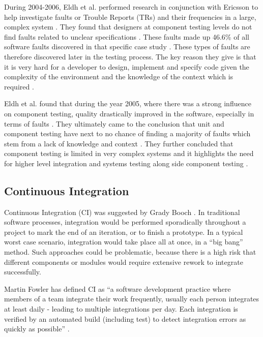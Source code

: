 \documentclass[fina_report_innit.tex]{subfiles}
\begin{document}
During 2004-2006, Eldh et al. performed research in conjunction with Ericsson to help investigate faults or Trouble Reports (TRs) and their frequencies in a large, complex system \cite{eldh2007component}. They found that designers at component testing levels do not find faults related to unclear specifications \cite{eldh2007component}. These faults made up 46.6\% of all software faults discovered in that specific case study \cite{eldh2007component}. These types of faults are therefore discovered later in the testing process. The key reason they give is that it is very hard for a developer to design, implement and specify code given the complexity of the environment and the knowledge of the context which is required \cite{eldh2007component}. 

Eldh et al. found that during the year 2005, where there was a strong influence on component testing, quality drastically improved in the software, especially in terms of faults \cite{eldh2007component}. They ultimately came to the conclusion that unit and component testing have next to no chance of finding a majority of faults which stem from a lack of knowledge and context \cite{eldh2007component}. They further concluded that component testing is limited in very complex systems and it highlights the need for higher level integration and systems testing along side component testing \cite{eldh2007component}.

\subsection{Continuous Integration}
Continuous Integration (CI) was suggested by Grady Booch \cite{booch2006object}. In traditional software processes, integration would be performed sporadically throughout a project to mark the end of an iteration, or to finish a prototype. In a typical worst case scenario, integration would take place all at once, in a “big bang” method. Such approaches could be problematic, because there is a high risk that different components or modules would require extensive rework to integrate successfully.

Martin Fowler has defined CI as “a software development practice where members of a team  integrate  their  work  frequently,  usually  each person  integrates  at  least  daily  -  leading  to  multiple integrations per day. Each integration is verified by an automated build (including test) to detect integration errors as quickly as possible” \cite{fowler2006continuous}.
\end{document}
